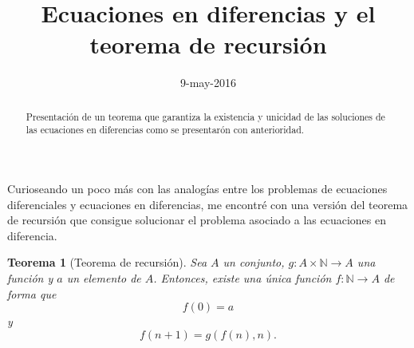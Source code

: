 \documentclass[letter,10pt,notitlepage]{amsart}
\title{Ecuaciones en diferencias y el teorema de recursión}
\date{9-may-2016}
\newtheorem{theorem}{Teorema}
\theoremstyle{definition}
\theoremstyle{remark}
\begin{document}
\begin{abstract}
  Presentación de un teorema que garantiza la existencia y
  unicidad de las soluciones de las ecuaciones en diferencias
  como se presentarón con anterioridad.
\end{abstract}
\maketitle


Curioseando un poco más con las analogías entre los
problemas de ecuaciones diferenciales y ecuaciones en diferencias,
me encontré con una versión del teorema de recursión que
consigue solucionar el problema asociado a las ecuaciones
en diferencia.

\begin{theorem}[Teorema de recursión]
  Sea \( A\) un conjunto, \( g \colon A \times \mathbb{N} \to A\)
  una función y \( a\) un elemento de \( A\). Entonces,
  existe una única función \( f \colon \mathbb{N} \to A\) de
  forma que \[f(0) = a\] y \[ f(n+1)=g\left( f(n),n \right).\]
\end{theorem}
\end{document}

